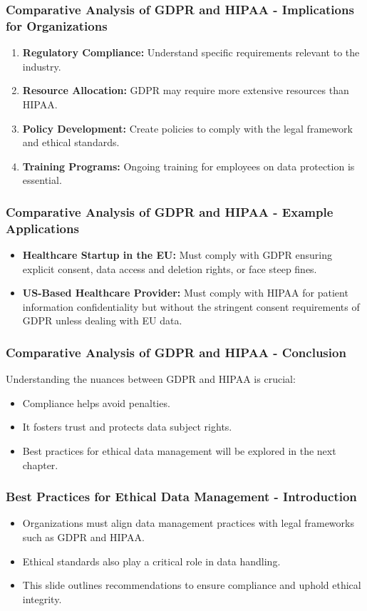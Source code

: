 \documentclass[aspectratio=169]{beamer}
\begin{document}
\begin{frame}[fragile]
    \frametitle{Comparative Analysis of GDPR and HIPAA - Implications for Organizations}
    \begin{enumerate}
        \item \textbf{Regulatory Compliance:} Understand specific requirements relevant to the industry.
        \item \textbf{Resource Allocation:} GDPR may require more extensive resources than HIPAA.
        \item \textbf{Policy Development:} Create policies to comply with the legal framework and ethical standards.
        \item \textbf{Training Programs:} Ongoing training for employees on data protection is essential.
    \end{enumerate}
\end{frame}

\begin{frame}[fragile]
    \frametitle{Comparative Analysis of GDPR and HIPAA - Example Applications}
    \begin{itemize}
        \item \textbf{Healthcare Startup in the EU:} Must comply with GDPR ensuring explicit consent, data access and deletion rights, or face steep fines.
        \item \textbf{US-Based Healthcare Provider:} Must comply with HIPAA for patient information confidentiality but without the stringent consent requirements of GDPR unless dealing with EU data.
    \end{itemize}
\end{frame}

\begin{frame}[fragile]
    \frametitle{Comparative Analysis of GDPR and HIPAA - Conclusion}
    Understanding the nuances between GDPR and HIPAA is crucial:
    \begin{itemize}
        \item Compliance helps avoid penalties.
        \item It fosters trust and protects data subject rights.
        \item Best practices for ethical data management will be explored in the next chapter.
    \end{itemize}
\end{frame}

\begin{frame}[fragile]
    \frametitle{Best Practices for Ethical Data Management - Introduction}
    \begin{itemize}
        \item Organizations must align data management practices with legal frameworks such as GDPR and HIPAA.
        \item Ethical standards also play a critical role in data handling.
        \item This slide outlines recommendations to ensure compliance and uphold ethical integrity.
    \end{itemize}
\end{frame}
\end{document}
